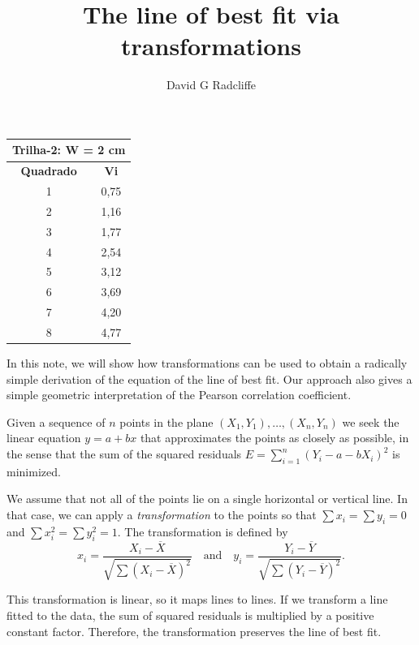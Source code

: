 \documentclass{article}
\begin{document}
\title{The line of best fit via transformations}
\author{David G Radcliffe}
\maketitle
\thispagestyle{empty}

\begin{table}[h]
\centering
\begin{tabular}{|c|c|}
\hline
\multicolumn{2}{|c|}{\textbf{Trilha-2: W = 2 cm}} \\ \hline
\textbf{Quadrado} & \textbf{Vi} \\ \hline
1 & 0,75     \\ \hline
2 & 1,16 \\ \hline
3 & 1,77 \\ \hline
4 & 2,54 \\ \hline
5 & 3,12 \\ \hline
6 & 3,69 \\ \hline
7 & 4,20 \\ \hline
8 & 4,77  \\ \hline
\end{tabular}
\end{table}
\iffalse
In this note, we will show how transformations can be used to obtain
a radically simple derivation of the equation of the line of best fit.
Our approach also gives a simple geometric interpretation of the Pearson
correlation coefficient.

Given a sequence of $n$ points in the plane $(X_1, Y_1), \ldots, (X_n, Y_n)$
we seek the linear equation $y = a + bx$ that approximates the points
as closely as possible, in the sense that the sum of the squared residuals
$E = \sum_{i=1}^n (Y_i - a - bX_i)^2$ is minimized.

We assume that not all of the points lie on a single horizontal or vertical
line. In that case, we can apply a \emph{transformation} to the points
so that $\sum x_i = \sum y_i = 0$ and $\sum x_i^2 = \sum y_i^2 = 1$.
The transformation is defined by
$$
x_i = \frac{X_i - \overline{X}}{\sqrt{\sum (X_i - \overline{X})^2}}\quad\text{and}\quad
y_i = \frac{Y_i - \overline{Y}}{\sqrt{\sum (Y_i - \overline{Y})^2}}.
$$

This transformation is linear, so it maps lines to lines.
If we transform a line fitted to the data,
the sum of squared residuals is multiplied by a positive constant factor.
Therefore, the transformation preserves the line of best fit.
\end{document}
